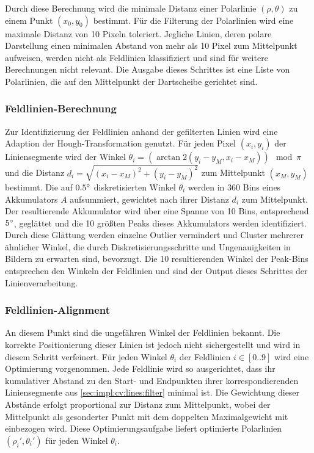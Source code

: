 Durch diese Berechnung wird die minimale Distanz einer Polarlinie $(\rho, \theta)$ zu einem Punkt $(x_0, y_0)$ bestimmt. Für die Filterung der Polarlinien wird eine maximale Distanz von 10 Pixeln toleriert. Jegliche Linien, deren polare Darstellung einen minimalen Abstand von mehr als 10 Pixel zum Mittelpunkt aufweisen, werden nicht als Feldlinien klassifiziert und sind für weitere Berechnungen nicht relevant. Die Ausgabe dieses Schrittes ist eine Liste von Polarlinien, die auf den Mittelpunkt der Dartscheibe gerichtet sind.

\subsubsection{Feldlinien-Berechnung}
\label{sec:impl:cv:lines:fields}

Zur Identifizierung der Feldlinien anhand der gefilterten Linien wird eine Adaption der Hough-Transformation genutzt. Für jeden Pixel $(x_i, y_i)$ der Liniensegmente wird der Winkel $\theta_i=(\arctan2{(y_i - y_M, x_i - x_M)}) \mod \pi$ und die Distanz $d_i=\sqrt{(x_i - x_M)^2+(y_i - y_M)^2} $ zum Mittelpunkt $(x_M, y_M)$ bestimmt. Die auf $0.5^{\circ}$ diskretisierten Winkel $\theta_i$ werden in 360 Bins eines Akkumulators $A$ aufsummiert, gewichtet nach ihrer Distanz $d_i$ zum Mittelpunkt. Der resultierende Akkumulator wird über eine Spanne von 10 Bins, entsprechend $5^{\circ}$, geglättet und die 10 größten Peaks dieses Akkumulators werden identifiziert. Durch diese Glättung werden einzelne Outlier vermindert und Cluster mehrerer ähnlicher Winkel, die durch Diskretisierungsschritte und Ungenauigkeiten in Bildern zu erwarten sind, bevorzugt. Die 10 resultierenden Winkel der Peak-Bins entsprechen den Winkeln der Feldlinien und sind der Output dieses Schrittes der Linienverarbeitung.

\subsubsection{Feldlinien-Alignment}
\label{sec:impl:cv:lines:lines_align}

An diesem Punkt sind die ungefähren Winkel der Feldlinien bekannt. Die korrekte Positionierung dieser Linien ist jedoch nicht sichergestellt und wird in diesem Schritt verfeinert. Für jeden Winkel $\theta_i$ der Feldlinien $i \in [0..9]$ wird eine Optimierung vorgenommen. Jede Feldlinie wird so ausgerichtet, dass ihr kumulativer Abstand zu den Start- und Endpunkten ihrer korrespondierenden Liniensegmente aus \autoref{sec:impl:cv:lines:filter} minimal ist. Die Gewichtung dieser Abstände erfolgt proportional zur Distanz zum Mittelpunkt, wobei der Mittelpunkt als gesonderter Punkt mit dem doppelten Maximalgewicht mit einbezogen wird. Diese Optimierungsaufgabe liefert optimierte Polarlinien $(\rho_i', \theta_i')$ für jeden Winkel $\theta_i$.

